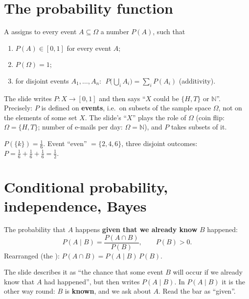 \section{The probability function}

\begin{defn}
A  assigns to every event $A\subseteq\Omega$ a number $P(A)$, such that
\begin{enumerate}
  \item $P(A)\in[0,1]$ for every event $A$;
  \item $P(\Omega)=1$;
  \item for disjoint events $A_1,\dots,A_n$: $\;P\big(\bigcup_iA_i\big)=\sum_iP(A_i)$ (additivity).
\end{enumerate}
\end{defn}

\begin{pitfall}
The slide writes $P:X\to[0,1]$ and then says ``$X$ could be $\{H,T\}$ or $\mathbb N$''. Precisely: $P$ is defined on \textbf{events}, i.e.\ on subsets of the
sample space $\Omega$, not on the elements of some set $X$. The slide's ``$X$'' plays the role of $\Omega$ (coin flip: $\Omega=\{H,T\}$; number of e-mails
per day: $\Omega=\mathbb N$), and $P$ takes subsets of it.
\end{pitfall}

\begin{example}
$P(\{k\})=\frac16$. Event ``even'' $=\{2,4,6\}$, three disjoint outcomes: $P=\frac16+\frac16+\frac16=\frac12$.
\end{example}

\section{Conditional probability, independence, Bayes}

\begin{defn}
The probability that $A$ happens \textbf{given that we already know} $B$ happened:
\[ P(A\mid B)=\frac{P(A\cap B)}{P(B)},\qquad P(B)>0. \]
Rearranged (the ): $P(A\cap B)=P(A\mid B)\,P(B)$.
\end{defn}

\begin{pitfall}
The slide describes it as ``the chance that some event $B$ will occur if we already know that $A$ had happened'', but then writes $P(A\mid B)$.
In $P(A\mid B)$ it is the other way round: $B$ is \textbf{known}, and we ask about $A$. Read the bar as ``given''.
\end{pitfall}

